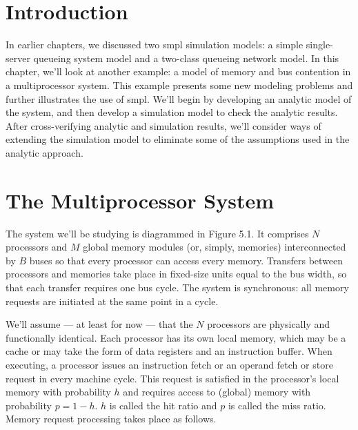 \setcounter{chapter}{5}
\setcounter{section}{0}
\label{chap:multiprocessor-system}

\section{Introduction}
\label{sec:mp-introduction}

In earlier chapters, we discussed two smpl simulation models: a simple
single-server queueing system model and a two-class queueing network model.
In this chapter, we'll look at another example: a model of memory and bus
contention in a multiprocessor system. This example presents some new
modeling problems and further illustrates the use of smpl. We'll begin by
developing an analytic model of the system, and then develop a simulation
model to check the analytic results. After cross-verifying analytic and
simulation results, we'll consider ways of extending the simulation model to
eliminate some of the assumptions used in the analytic approach.

\section{The Multiprocessor System}
\label{sec:mp-system}

The system we'll be studying is diagrammed in Figure 5.1. It comprises $N$
processors and $M$ global memory modules (or, simply, memories)
interconnected by $B$ buses so that every processor can access every memory.
Transfers between processors and memories take place in fixed-size units
equal to the bus width, so that each transfer requires one bus cycle. The
system is synchronous: all memory requests are initiated at the same point in
a cycle.

We'll assume --- at least for now --- that the $N$ processors are physically
and functionally identical. Each processor has its own local memory, which
may be a cache or may take the form of data registers and an instruction
buffer. When executing, a processor issues an instruction fetch or an operand
fetch or store request in every machine cycle. This request is satisfied in the
processor's local memory with probability $h$ and requires access to (global)
memory with probability $p=1-h$. $h$ is called the hit ratio and $p$ is called
the miss ratio. Memory request processing takes place as follows.

